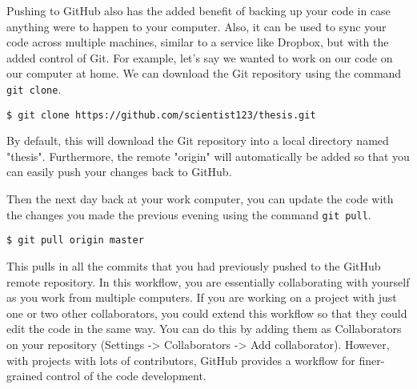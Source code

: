 Pushing to GitHub also has the added benefit of backing up your code in case anything were to happen to your computer.
Also, it can be used to sync your code across multiple machines, similar to a service like Dropbox, but with the added control of Git.
For example, let's say we wanted to work on our code on our computer at home.
We can download the Git repository using the command \verb|git clone|.

\begin{lstlisting}
$ git clone https://github.com/scientist123/thesis.git
\end{lstlisting}

By default, this will download the Git repository into a local directory named "thesis".
Furthermore, the remote "origin" will automatically be added so that you can easily push your changes back to GitHub.

Then the next day back at your work computer, you can update the code with the changes you made the previous evening using the command \verb|git pull|.

\begin{lstlisting}
$ git pull origin master
\end{lstlisting}

This pulls in all the commits that you had previously pushed to the GitHub remote repository.
In this workflow, you are essentially collaborating with yourself as you work from multiple computers.
If you are working on a project with just one or two other collaborators, you could extend this workflow so that they could edit the code in the same way.
You can do this by adding them as Collaborators on your repository (Settings -> Collaborators -> Add collaborator).
However, with projects with lots of contributors, GitHub provides a workflow for finer-grained control of the code development.